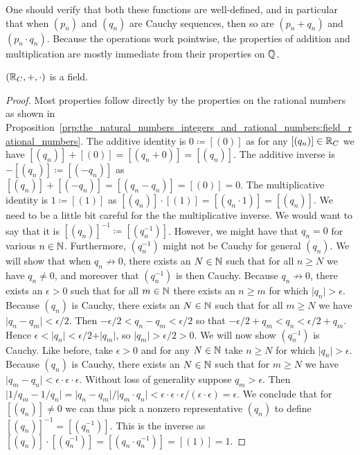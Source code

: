 \documentclass[../main.tex]{subfiles}
\begin{document}
One should verify that both these functions are well-defined, and in particular that when $(p_n)$ and $(q_n)$ are Cauchy sequences, then so are $(p_n+q_n)$ and $(p_n\cdot q_n)$. Because the operations work pointwise, the properties of addition and multiplication are mostly immediate from their properties on $\mathbb{Q}$.
\begin{proposition}\label{prp:the_real_numbers:cantor_field_real_numbers}
    $(\mathbb{R}_C,+,\cdot)$ is a field.
\end{proposition}
\begin{proof}
    Most properties follow directly by the properties on the rational numbers as shown in Proposition~\ref{prp:the_natural_numbers_integers_and_rational_numbers:field_rational_numbers}. The additive identity is $0\coloneq[(0)]$ as for any $[(q_n)]\in\mathbb{R}_C$ we have $[(q_n)]+[(0)]=[(q_n+0)]=[(q_n)]$. The additive inverse is $-[(q_n)]\coloneq[(-q_n)]$ as $[(q_n)]+[(-q_n)]=[(q_n-q_n)]=[(0)]=0$. The multiplicative identity is $1\coloneq[(1)]$ as $[(q_n)]\cdot[(1)]=[(q_n\cdot1)]=[(q_n)]$. We need to be a little bit careful for the the multiplicative inverse. We would want to say that it is $[(q_n)]^{-1}\coloneq[(q_n^{-1})]$. However, we might have that $q_n=0$ for various $n\in\mathbb{N}$. Furthermore, $(q_n^{-1})$ might not be Cauchy for general $(q_n)$. We will show that when $q_n\not\to0$, there exists an $N\in\mathbb{N}$ such that for all $n\geq N$ we have $q_n\neq0$, and moreover that $(q_n^{-1})$ is then Cauchy. Because $q_n\not\to0$, there exists an $\epsilon>0$ such that for all $m\in\mathbb{N}$ there exists an $n\geq m$ for which $\vert q_n\vert>\epsilon$. Because $(q_n)$ is Cauchy, there exists an $N\in\mathbb{N}$ such that for all $m\geq N$ we have $\vert q_n-q_m\vert<\epsilon/2$. Then $-\epsilon/2<q_n-q_m<\epsilon/2$ so that $-\epsilon/2+q_m<q_n<\epsilon/2+q_m$. Hence $\epsilon<\vert q_n\vert<\epsilon/2+\vert q_m\vert$, so $\vert q_m\vert>\epsilon/2>0$. We will now show $(q_n^{-1})$ is Cauchy. Like before, take $\epsilon>0$ and for any $N\in\mathbb{N}$ take $n\geq N$ for which $\vert q_n\vert>\epsilon$. Because $(q_n)$ is Cauchy, there exists an $N\in\mathbb{N}$ such that for $m\geq N$ we have $\vert q_m-q_n\vert<\epsilon\cdot\epsilon\cdot\epsilon$. Without loss of generality suppose $q_m>\epsilon$. Then $\vert1/q_m-1/q_n\vert=\vert q_n-q_m\vert/\vert q_m\cdot q_n\vert<\epsilon\cdot\epsilon\cdot\epsilon/(\epsilon\cdot\epsilon)=\epsilon$. We conclude that for $[(q_n)]\neq0$ we can thus pick a nonzero representative $(q_n)$ to define $[(q_n)]^{-1}=[(q_n^{-1})]$. This is the inverse as $[(q_n)]\cdot[(q_n^{-1})]=[(q_n\cdot q_n^{-1})]=[(1)]=1$.
\end{proof}
\end{document}
